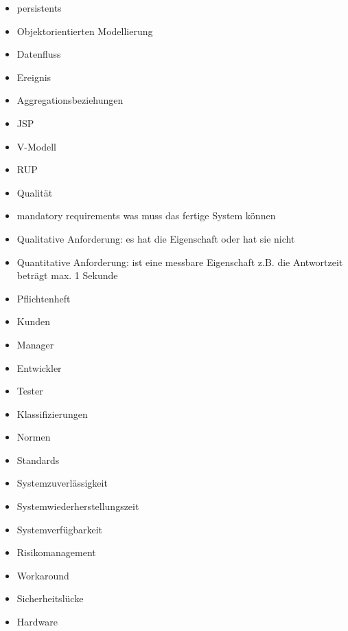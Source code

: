 \begin{itemize}
\item persistents
\item Objektorientierten Modellierung
\item Datenfluss
\item Ereignis
\item Aggregationsbeziehungen
\item JSP
\item V-Modell
\item RUP
\item Qualität
\item mandatory requirements was muss das fertige System können
\item Qualitative Anforderung: es hat die Eigenschaft oder hat sie nicht
\item Quantitative Anforderung: ist eine messbare Eigenschaft z.B. die Antwortzeit beträgt max. 1 Sekunde
\item Pflichtenheft
\item Kunden
\item Manager
\item Entwickler
\item Tester
\item Klassifizierungen
\item Normen
\item Standards
\item Systemzuverlässigkeit
\item Systemwiederherstellungszeit
\item Systemverfügbarkeit
\item Risikomanagement
\item Workaround
\item Sicherheitslücke
\item Hardware

\end{itemize}